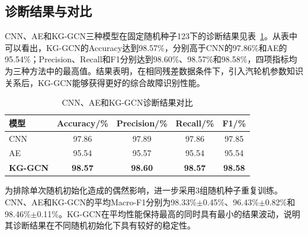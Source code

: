 \subsection{诊断结果与对比}
\label{subsec:results_v6}

CNN、AE和KG-GCN三种模型在固定随机种子123下的诊断结果见表~\ref{tab:main_result_v6}。从表中可以看出，KG-GCN的Accuracy达到98.57\%，分别高于CNN的97.86\%和AE的95.54\%；Precision、Recall和F1分别达到98.60\%、98.57\%和98.58\%，四项指标均为三种方法中的最高值。结果表明，在相同残差数据条件下，引入汽轮机参数知识关系后，KG-GCN能够获得更好的综合故障识别性能。

\begin{table}[htbp]
    \centering
    \caption{CNN、AE和KG-GCN诊断结果对比}
    \label{tab:main_result_v6}
    \begin{tabular}{lcccc}
        \toprule
        模型 & Accuracy/\% & Precision/\% & Recall/\% & F1/\% \\
        \midrule
        CNN & 97.86 & 97.89 & 97.86 & 97.85 \\
        AE & 95.54 & 95.57 & 95.54 & 95.54 \\
        \textbf{KG-GCN} & \textbf{98.57} & \textbf{98.60} & \textbf{98.57} & \textbf{98.58} \\
        \bottomrule
    \end{tabular}
\end{table}

为排除单次随机初始化造成的偶然影响，进一步采用3组随机种子重复训练。CNN、AE和KG-GCN的平均Macro-F1分别为98.33\%$\pm$0.45\%、96.43\%$\pm$0.82\%和98.46\%$\pm$0.11\%。KG-GCN在平均性能保持最高的同时具有最小的结果波动，说明其诊断结果在不同随机初始化下具有较好的稳定性。

